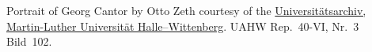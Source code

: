 Portrait of Georg Cantor by Otto Zeth courtesy of the
\href{http://www.archiv.uni-halle.de/}{Universit\"atsarchiv,
Martin-Luther Universit\"at Halle--Wittenberg}. UAHW Rep.~40-VI, Nr.~3
Bild~102.
